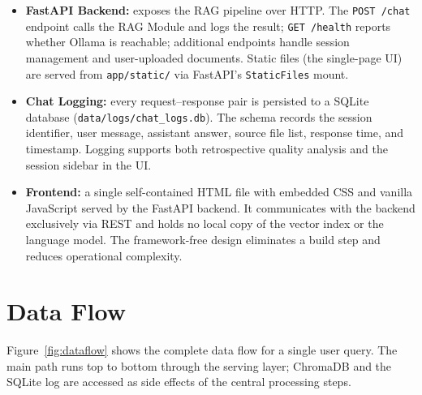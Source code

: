 \begin{itemize}
    \item \textbf{FastAPI Backend:} exposes the RAG pipeline over HTTP. The \texttt{POST /chat} endpoint calls the RAG Module and logs the result; \texttt{GET /health} reports whether Ollama is reachable; additional endpoints handle session management and user-uploaded documents. Static files (the single-page UI) are served from \texttt{app/static/} via FastAPI's \texttt{StaticFiles} mount.

    \item \textbf{Chat Logging:} every request–response pair is persisted to a SQLite database (\texttt{data/logs/chat\_logs.db}). The schema records the session identifier, user message, assistant answer, source file list, response time, and timestamp. Logging supports both retrospective quality analysis and the session sidebar in the UI.

    \item \textbf{Frontend:} a single self-contained HTML file with embedded CSS and vanilla JavaScript served by the FastAPI backend. It communicates with the backend exclusively via REST and holds no local copy of the vector index or the language model. The framework-free design eliminates a build step and reduces operational complexity.
\end{itemize}

\section{Data Flow}
\label{sec:design-dataflow}

Figure~\ref{fig:dataflow} shows the complete data flow for a single user query.
The main path runs top to bottom through the serving layer; ChromaDB and the
SQLite log are accessed as side effects of the central processing steps.

